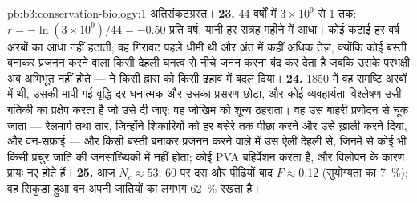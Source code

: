 \begin{solution}{pb:b3:conservation-biology:1}
अतिसंकटग्रस्त।
\textbf{23.} 44 वर्षों में $3\times 10^{9}$ से $1$ तक: $r = -\ln(3\times
10^{9})/44 = -0.50$ प्रति वर्ष, यानी हर सत्रह महीने में आधा। कोई कटाई
हर वर्ष अरबों का आधा नहीं हटाती; वह गिरावट पहले धीमी थी और अंत में कहीं
अधिक तेज़, क्योंकि कोई बस्ती बनाकर प्रजनन करने वाला किसी देहली घनत्व से
नीचे जनन करना बंद कर देता है जबकि उसके परभक्षी अब अभिभूत नहीं होते ---
 ने किसी ह्रास को किसी ढहाव में बदल दिया।
\textbf{24.} 1850 में वह समष्टि अरबों में थी, उसकी मापी गई वृद्धि-दर
धनात्मक और उसका प्रसरण छोटा, और कोई व्यवहार्यता विश्लेषण उसी गतिकी का
प्रक्षेप करता है जो उसे दी जाए: वह जोखिम को शून्य ठहराता। वह उस बाहरी
प्रणोदन से चूक जाता --- रेलमार्ग तथा तार, जिन्होंने शिकारियों को हर
बसेरे तक पीछा करने और उसे ख़ाली करने दिया, और वन-सफ़ाई --- और किसी बस्ती
बनाकर प्रजनन करने वाले में उस ऐली देहली से, जिनमें से कोई भी किसी प्रचुर
जाति की जनसांख्यिकी में नहीं होता; कोई PVA बहिर्वेशन करता है, और विलोपन
के कारण प्रायः नए होते हैं।
\textbf{25.} आज $N_{e} \approx 53$; 60 पर दस और पीढ़ियों बाद
$F \approx 0.12$ (सुयोग्यता का \qty{7}{\%}); वह सिकुड़ा हुआ वन अपनी जातियों
का लगभग \qty{62}{\%} रखता है।
\end{solution}
